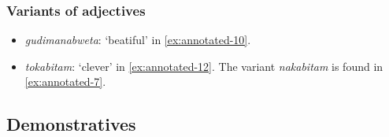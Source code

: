 \documentclass{article}
\newcommand*{\corpus}[1]{\emph{#1}}
\newcommand{\translate}[1]{`#1'}
\begin{document}
\subsubsection{Variants of adjectives}\label{sec:adjectives-observe}

\begin{itemize}
    \item \corpus{gudimanabweta}: \translate{beatiful} in \eqref{ex:annotated-10}.
    \item \corpus{tokabitam}: \translate{clever} in \eqref{ex:annotated-12}.
    The variant \corpus{nakabitam} is found in \eqref{ex:annotated-7}.
\end{itemize}

\subsection{Demonstratives}\label{sec:demonstrative}
\end{document}
